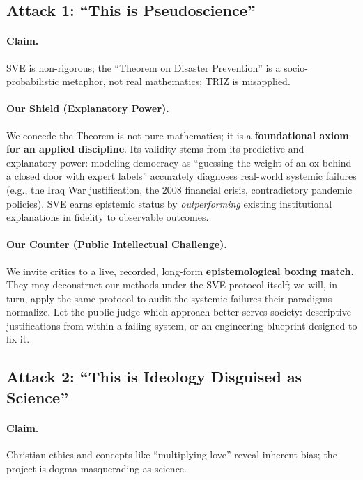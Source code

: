 \documentclass[11pt,a4paper]{article}
\begin{document}
\subsection*{\textcolor{accentcolor}{Attack 1: ``This is Pseudoscience''}}

\paragraph{\textbf{Claim.}} SVE is non-rigorous; the ``Theorem on Disaster Prevention'' is a socio-probabilistic metaphor, not real mathematics; TRIZ is misapplied.

\paragraph{\textbf{Our Shield (Explanatory Power).}} We concede the Theorem is not pure mathematics; it is a \textbf{foundational axiom for an applied discipline}. Its validity stems from its predictive and explanatory power: modeling democracy as ``guessing the weight of an ox behind a closed door with expert labels'' accurately diagnoses real-world systemic failures (e.g., the Iraq War justification, the 2008 financial crisis, contradictory pandemic policies). SVE earns epistemic status by \textit{outperforming} existing institutional explanations in fidelity to observable outcomes.

\paragraph{\textbf{Our Counter (Public Intellectual Challenge).}} We invite critics to a live, recorded, long-form \textbf{epistemological boxing match}. They may deconstruct our methods under the SVE protocol itself; we will, in turn, apply the same protocol to audit the systemic failures their paradigms normalize. Let the public judge which approach better serves society: descriptive justifications from within a failing system, or an engineering blueprint designed to fix it.

\vspace{1em}

\subsection*{\textcolor{accentcolor}{Attack 2: ``This is Ideology Disguised as Science''}}

\paragraph{\textbf{Claim.}} Christian ethics and concepts like ``multiplying love'' reveal inherent bias; the project is dogma masquerading as science.
\end{document}
